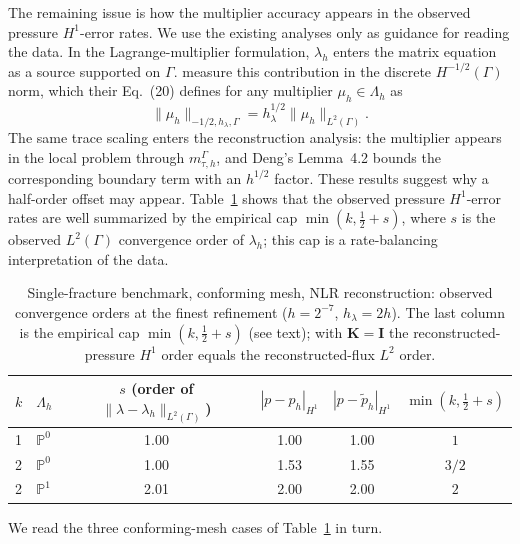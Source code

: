 \documentclass[a4paper,fleqn]{cas-sc}
\newcommand{\Kmat}{\mathbf{K}}
\begin{document}
The remaining issue is how the multiplier accuracy appears in the observed
pressure \(H^1\)-error rates. We use the existing analyses only as guidance for
reading the data. In the Lagrange-multiplier formulation, \(\lambda_h\) enters the matrix
equation as a source supported on \(\Gamma\). \citet{Koeppel2019} measure this
contribution in the discrete \(H^{-1/2}(\Gamma)\) norm, which their Eq.~(20)
defines for any multiplier \(\mu_h\in\Lambda_h\) as
\[
\|\mu_h\|_{-1/2,h_\lambda,\Gamma}
=
h_\lambda^{1/2}\|\mu_h\|_{L^2(\Gamma)} .
\]
The same trace scaling enters the reconstruction analysis: the multiplier appears
in the local problem through \(m_{\tau,h}^\Gamma\), and Deng's Lemma~4.2 bounds
the corresponding boundary term with an \(h^{1/2}\) factor. These results suggest why a half-order offset may appear.
Table~\ref{tab:single_fracture_reconstruction} shows that the observed pressure
\(H^1\)-error rates are well summarized by the empirical cap
\(\min(k,\tfrac12+s)\), where \(s\) is the observed \(L^2(\Gamma)\) convergence
order of \(\lambda_h\); this cap is a rate-balancing interpretation of the data.

\begin{table}[!htbp]
\centering
\caption{Single-fracture benchmark, conforming mesh, NLR reconstruction:
observed convergence orders at the finest refinement (\(h=2^{-7}\),
\(h_\lambda=2h\)). The last column is the empirical cap \(\min(k,\tfrac12+s)\)
(see text); with \(\Kmat=\mathbf{I}\) the reconstructed-pressure \(H^1\) order
equals the reconstructed-flux \(L^2\) order.}
\label{tab:single_fracture_reconstruction}
\begin{tabular}{llcccc}
\toprule
\(k\) & \(\Lambda_h\) &
\(s\) (order of \(\|\lambda-\lambda_h\|_{L^2(\Gamma)}\)) &
\(|p-p_h|_{H^1}\) &
\(|p-\widetilde p_h|_{H^1}\) &
\(\min(k,\tfrac12{+}s)\)\\
\midrule
1 & \(\mathbb{P}^0\) & 1.00 & 1.00 & 1.00 & \(1\)\\
2 & \(\mathbb{P}^0\) & 1.00 & 1.53 & 1.55 & \(3/2\)\\
2 & \(\mathbb{P}^1\) & 2.01 & 2.00 & 2.00 & \(2\)\\
\bottomrule
\end{tabular}
\end{table}


We read the three conforming-mesh cases of
Table~\ref{tab:single_fracture_reconstruction} in turn.
\end{document}
